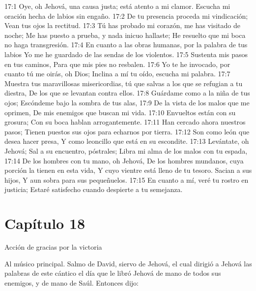 17:1 Oye, oh Jehová, una causa justa; está atento a mi clamor. 
Escucha mi oración hecha de labios sin engaño. 
17:2 De tu presencia proceda mi vindicación; 
Vean tus ojos la rectitud. 
17:3 Tú has probado mi corazón, me has visitado de noche; 
Me has puesto a prueba, y nada inicuo hallaste; 
He resuelto que mi boca no haga transgresión. 
17:4 En cuanto a las obras humanas, por la palabra de tus labios 
Yo me he guardado de las sendas de los violentos. 
17:5 Sustenta mis pasos en tus caminos, 
Para que mis pies no resbalen. 
17:6 Yo te he invocado, por cuanto tú me oirás, oh Dios; 
Inclina a mí tu oído, escucha mi palabra. 
17:7 Muestra tus maravillosas misericordias, tú que salvas a los que se refugian a tu diestra, 
De los que se levantan contra ellos. 
17:8 Guárdame como a la niña de tus ojos; 
Escóndeme bajo la sombra de tus alas, 
17:9 De la vista de los malos que me oprimen, 
De mis enemigos que buscan mi vida. 
17:10 Envueltos están con su grosura; 
Con su boca hablan arrogantemente. 
17:11 Han cercado ahora nuestros pasos; 
Tienen puestos sus ojos para echarnos por tierra. 
17:12 Son como león que desea hacer presa, 
Y como leoncillo que está en su escondite. 
17:13 Levántate, oh Jehová; 
Sal a su encuentro, póstrales; 
Libra mi alma de los malos con tu espada, 
17:14 De los hombres con tu mano, oh Jehová, 
De los hombres mundanos, cuya porción la tienen en esta vida, 
Y cuyo vientre está lleno de tu tesoro. 
Sacian a sus hijos, 
Y aun sobra para sus pequeñuelos. 
17:15 En cuanto a mí, veré tu rostro en justicia; 
Estaré satisfecho cuando despierte a tu semejanza. 
\section*{Capítulo 18}
Acción de gracias por la victoria 

Al músico principal. Salmo de David, siervo de Jehová, el cual dirigió a Jehová las palabras de este cántico el día que le libró Jehová de mano de todos sus enemigos, y de mano de Saúl. Entonces dijo: 

